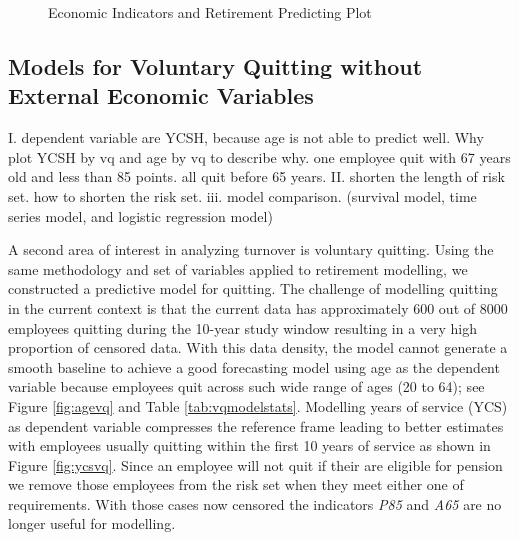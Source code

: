 \documentclass[12pt,letterpaper]{article}
\begin{document}
   \begin{figure}[h!]
   	\centering
   	\caption{Economic Indicators and Retirement Predicting Plot}
   	\label{fig:EIndex}
   \end{figure}
\subsection{Models for Voluntary Quitting without External Economic Variables}

I. dependent variable are YCSH, because age is not able to predict well. Why plot YCSH by vq and age by vq to describe why.
one employee quit with 67 years old and less than 85 points. all quit before 65 years.
II. shorten the length of risk set. how to shorten the risk set.
iii. model comparison. (survival model, time series model, and logistic regression model)

A second area of interest in analyzing turnover is voluntary quitting.  Using the same methodology and set of variables applied to retirement modelling, we constructed a predictive model for quitting. The challenge of modelling quitting in the current context is that the current data has approximately 600 out of 8000 employees quitting during the 10-year study window resulting in a very high proportion of censored data.  With this data density, the model cannot generate a smooth baseline to achieve a good forecasting model using age as the dependent variable because employees quit across such wide range of ages (20 to 64); see Figure \ref{fig:agevq} and Table \ref{tab:vqmodelstats}.  Modelling years of service (YCS) as dependent variable compresses the reference frame leading to better estimates with employees usually quitting within the first 10 years of service as shown in Figure \ref{fig:ycsvq}. Since an employee will not quit if their are eligible for pension we remove those employees from the risk set when they meet either one of requirements.  With those cases now censored the indicators {\it P85} and {\it A65} are no longer useful for modelling.
\end{document}
